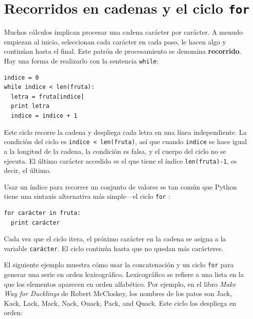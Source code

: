 

\section{Recorridos en cadenas y el ciclo \texttt{for}}
\label{for}

Muchos cálculos implican procesar una cadena carácter por carácter. A 
menudo empiezan al inicio, seleccionan cada carácter en cada paso,
le hacen algo y continúan hasta el final. Este patrón de procesamiento
se denomina  {\bf recorrido}. Hay una forma de realizarlo con la
sentencia \texttt{while}:

\pagebreak
{}
\beforeverb
\begin{verbatim}
indice = 0
while indice < len(fruta):
  letra = fruta[indice]
  print letra
  indice = indice + 1
\end{verbatim}
\afterverb
%
Este ciclo recorre la cadena y despliega cada letra en una línea
independiente. La condición del ciclo es \texttt{indice < len(fruta)}, así
que cuando \texttt{indice} se hace igual a la longitud de la cadena,
la condición es falsa, y el cuerpo del ciclo no se ejecuta. El 
último carácter accedido es el que tiene el índice \texttt{len(fruta)-1},
es decir, el último.

Usar un índice para recorrer un conjunto de valores es tan común
que Python tiene una sintaxis alternativa más simple---el ciclo \texttt{for} :

\beforeverb
\begin{verbatim}
for carácter in fruta:
  print carácter
\end{verbatim}
\afterverb
%

Cada vez que el ciclo itera, el próximo carácter en la cadena se asigna
a la variable \texttt{carácter}. El ciclo continúa hasta que no quedan más
carácteres.


El siguiente ejemplo muestra cómo usar la concatenación y un
ciclo  \texttt{for} para generar una serie en orden lexicográfico.
Lexicográfico se refiere a una lista en la que los elementos
aparecen en orden alfabético. Por ejemplo, en el libro 
{\em Make Way for Ducklings} de  Robert McCloskey,  los 
nombres de los patos son  Jack, Kack, Lack, Mack,
Nack, Ouack, Pack, and Quack.  Este ciclo los despliega
en orden:


